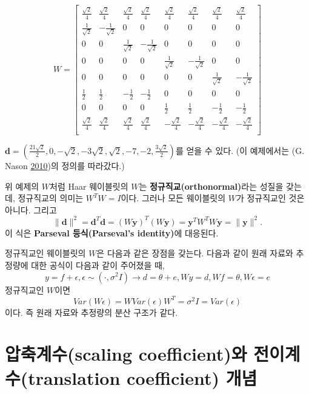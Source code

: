 \documentclass[b5paper,]{book}
\theoremstyle{definition}
\theoremstyle{definition}
\theoremstyle{definition}
\theoremstyle{remark}
\begin{document}
\[
W =
\begin{bmatrix}
\frac{\sqrt{2}}{4} & \frac{\sqrt{2}}{4} & \frac{\sqrt{2}}{4} & \frac{\sqrt{2}}{4} & \frac{\sqrt{2}}{4} & \frac{\sqrt{2}}{4} & \frac{\sqrt{2}}{4} & \frac{\sqrt{2}}{4}\\
\frac{1}{\sqrt{2}} & -\frac{1}{\sqrt{2}} & 0 & 0 & 0 & 0 & 0 & 0\\
 0 & 0 & \frac{1}{\sqrt{2}} & -\frac{1}{\sqrt{2}} & 0 & 0 & 0 & 0\\
 0 & 0 & 0 & 0 &  \frac{1}{\sqrt{2}} & -\frac{1}{\sqrt{2}} & 0 & 0\\
 0 & 0 & 0 & 0 & 0 & 0 &  \frac{1}{\sqrt{2}} & -\frac{1}{\sqrt{2}}\\
 \frac{1}{2} & \frac{1}{2} & -\frac{1}{2} & -\frac{1}{2} & 0 & 0 & 0 & 0 \\
 0 & 0 & 0 & 0 &  \frac{1}{2} & \frac{1}{2} & -\frac{1}{2} & -\frac{1}{2}\\
 \frac{\sqrt{2}}{4} & \frac{\sqrt{2}}{4} & \frac{\sqrt{2}}{4} & \frac{\sqrt{2}}{4} & -\frac{\sqrt{2}}{4} & -\frac{\sqrt{2}}{4} & -\frac{\sqrt{2}}{4} & -\frac{\sqrt{2}}{4}\\
\end{bmatrix}
\]

\(\mathbf{d}=(\frac{21\sqrt{2}}{2},0,-\sqrt{2},-3\sqrt{2},\sqrt{2},-7,-2,\frac{3\sqrt{2}}{2})\)를
얻을 수 있다. (이 예제에서는 (G. Nason
\protect\hyperlink{ref-Nason2010}{2010})의 정의를 따라갔다.)

위 예제의 \(W\)처럼 Haar 웨이블릿의 \(W\)는
\textbf{정규직교(orthonormal)}라는 성질을 갖는데, 정규직교의 의미는
\(W^{T}W=I\)이다. 그러나 모든 웨이블릿의 \(W\)가 정규직교인 것은 아니다.
그리고
\[\| \mathbf{d} \|^{2}=\mathbf{d}^{T}\mathbf{d}=(W\mathbf{y})^{T}(W\mathbf{y})=\mathbf{y}^{T}W^{T}W\mathbf{y}=\| \mathbf{y} \|^{2}.\]
이 식은 \textbf{Parseval 등식(Parseval's identity)}에 대응된다.

정규직교인 웨이블릿의 \(W\)은 다음과 같은 장점을 갖는다. 다음과 같이
원래 자료와 추정량에 대한 공식이 다음과 같이 주어졌을 때,
\[y=f+\epsilon, \epsilon \sim (\cdot, \sigma^{2}I) \rightarrow d=\theta +e, Wy=d, Wf=\theta, W\epsilon=e\]
정규직교인 \(W\)이면
\[Var(W\epsilon)=WVar(\epsilon)W^{T}=\sigma^{2}I=Var(\epsilon)\] 이다.
즉 원래 자료와 추정량의 분산 구조가 같다.

\section{압축계수(scaling coefficient)와 전이계수(translation
coefficient) 개념}\label{scaling-coefficient-translation-coefficient-}
\end{document}
